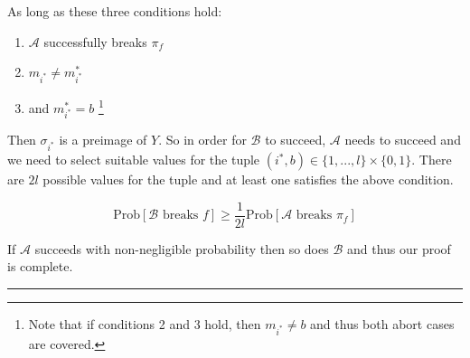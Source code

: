\documentclass[twoside]{article}
\newenvironment{proof}{{\bf Proof:}}{\hfill\rule{2mm}{2mm}}
\begin{document}
\begin{proof}
As long as these three conditions hold:
\begin{enumerate}
\item $\mathcal{A}$ successfully breaks $\pi_f$
\item $m_{i^*} \neq m^*_{i^*}$
\item and $m^*_{i^*} = b$ \footnote{Note that if conditions 2 and 3 hold, then $m_{i^*} \neq b$ and thus both abort cases are covered.}
\end{enumerate}

Then $\sigma_{i^*}$ is a preimage of $Y$. So in order for $\mathcal{B}$ to succeed, $\mathcal{A}$ needs to succeed and we need to select suitable values for the tuple $(i^*,b) \in \{1,...,l\} \times \{0,1\}$. There are $2l$ possible values for the tuple and at least one satisfies the above condition.

$$\text{Prob}[\mathcal{B}\text{ breaks }f] \geq \frac{1}{2l}\text{Prob}[\mathcal{A}\text{ breaks }\pi_f]$$

If $\mathcal{A}$ succeeds with non-negligible probability then so does $\mathcal{B}$ and thus our proof is complete.
\end{proof}
\end{document}
